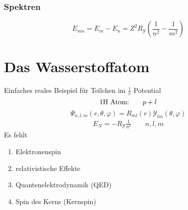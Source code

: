\subsubsection{Spektren}

\begin{equation*}
E_{mn} = E_{m}- E_{n} = Z^2 R_{\mathcal{Y}}\left(\frac{1}{n^2} - \frac{1}{m^2}\right)
\end{equation*}

\section{Das Wasserstoffatom}

Einfaches reales Beispiel für Teilchen im $ \frac{1}{r} $ Potential
\begin{equation*}
\textrm{1H Atom:} \qquad p + l
\end{equation*}
\begin{equation*}
\Psi_{n,l,m}(r,\theta,\varphi) = R_{ml}(r) \mathcal{Y}_{lm}(\theta,\varphi)
\end{equation*}
\begin{align*}
E_N = - R_{\mathcal{Y}}\frac{1}{n^2} \qquad n, l, m
\end{align*}
Es fehlt
\begin{enumerate}[$ \rightarrow $]
	\item Elektronenspin
	\item relativistische Effekte
	\item Quantenelektrodynamik (QED)
	\item Spin des Kerns (Kernspin)
\end{enumerate}

